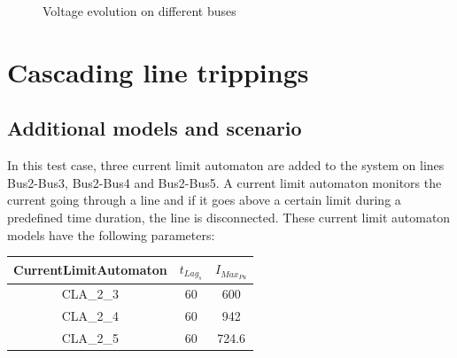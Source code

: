 \documentclass[a4paper, 12pt]{report}
\begin{document}
\begin{figure}[H]
\caption{Voltage evolution on different buses}
\end{figure}

\newpage
\section{Cascading line trippings}

\subsection{Additional models and scenario}

In this test case, three current limit automaton are added to the system on lines Bus2-Bus3, Bus2-Bus4 and Bus2-Bus5. A current limit automaton monitors the current going through a line and if it goes above a certain limit during a predefined time duration, the line is disconnected. These current limit automaton models have the following parameters:

\begin{center}
\begin{tabular}{|c|c|c|}
  \hline
  CurrentLimitAutomaton & $t_{{Lag}_{s}}$  & $I_{{Max}_{Pu}}$\\
  \hline
  CLA\_2\_3 & 60 & 600 \\
  CLA\_2\_4 & 60 & 942 \\
  CLA\_2\_5 & 60 & 724.6 \\
  \hline
\end{tabular}
\end{center}
\end{document}
